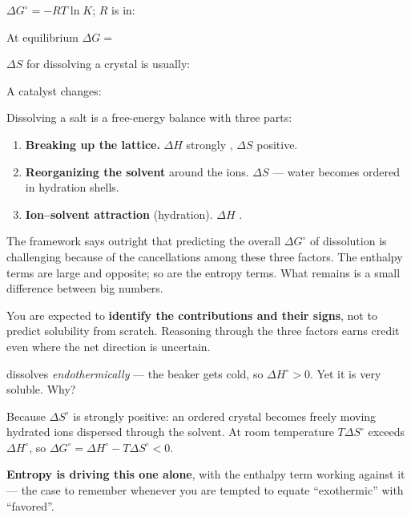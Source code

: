\documentclass{apchem-notes}
\begin{document}

\begin{warmup}[4]
  \item $\Delta G^\circ = -RT\ln K$; $R$ is in:
  \item At equilibrium $\Delta G = $ 
  \item $\Delta S$ for dissolving a crystal is usually:
  \item A catalyst changes: 
\end{warmup}



Dissolving a salt is a free-energy balance with three parts:

\begin{enumerate}[leftmargin=*,itemsep=0.3em]
  \item \textbf{Breaking up the lattice.} $\Delta H$ strongly
        , $\Delta S$ positive.
  \item \textbf{Reorganizing the solvent} around the ions. $\Delta S$
         --- water becomes ordered in hydration
        shells.
  \item \textbf{Ion--solvent attraction} (hydration). $\Delta H$
        .
\end{enumerate}

\begin{apcnote}
The framework says outright that predicting the overall $\Delta G^\circ$ of
dissolution is challenging because of the cancellations among these three
factors. The enthalpy terms are large and opposite; so are the entropy
terms. What remains is a small difference between big numbers.

You are expected to \textbf{identify the contributions and their signs},
not to predict solubility from scratch. Reasoning through the three factors
earns credit even where the net direction is uncertain.
\end{apcnote}

\begin{workedexample}
 dissolves \emph{endothermically} --- the beaker gets cold, so
$\Delta H^\circ > 0$. Yet it is very soluble. Why?

Because $\Delta S^\circ$ is strongly positive: an ordered crystal becomes
freely moving hydrated ions dispersed through the solvent. At room
temperature $T\Delta S^\circ$ exceeds $\Delta H^\circ$, so
$\Delta G^\circ = \Delta H^\circ - T\Delta S^\circ < 0$.

\textbf{Entropy is driving this one alone}, with the enthalpy term working
against it --- the case to remember whenever you are tempted to equate
``exothermic'' with ``favored''.
\end{workedexample}
\end{document}
